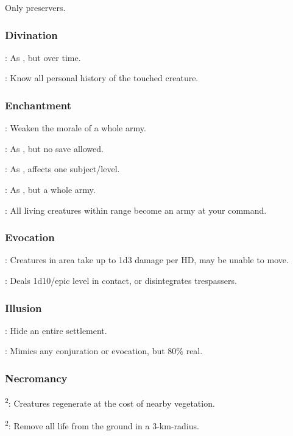  Only preservers.


\subsubsection{Divination}
: As , but over time. %

: Know all personal history of the touched creature.


\subsubsection{Enchantment}
: Weaken the morale of a whole army.

: As , but no save allowed.

: As , affects one subject/level. %

: As , but a whole army.

: All living creatures within range become an army at your command.


\subsubsection{Evocation}
: Creatures in area take up to 1d3 damage per HD, may be unable to move.

: Deals 1d10/epic level in contact, or disintegrates trespassers.


\subsubsection{Illusion}
: Hide an entire settlement. %

: Mimics any conjuration or evocation, but 80\% real. %


\subsubsection{Necromancy}
\textsuperscript{2}: Creatures regenerate at the cost of nearby vegetation.

\textsuperscript{2}: Remove all life from the ground in a 3-km-radius. %


